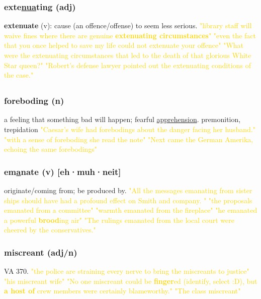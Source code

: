 \documentclass{proc}
\begin{document}
	\subsubsection{\textcolor{brickred}{exte\underline{nua}ting} (adj)}
	\textbf{extenuate} (v): cause (an offence/offense) to seem less serious.
	\textcolor{gold}{"library staff will waive fines where there are genuine \textbf{extenuating circumstances}" "even the fact that you once helped to save my life could not extenuate your offence" "What were the extenuating circumstances that led to the death of that glorious White Star queen?" "Robert's defense lawyer pointed out the extenuating conditions of the case."}
	
	\newpage
	\subsection{}
	\subsubsection{\textcolor{brickred}{foreboding} (n)}
	a feeling that something bad will happen; fearful \underline{apprehension}. premonition, trepidation
	\textcolor{gold}{"Caesar's wife had forebodings about the danger facing her husband." "with a sense of foreboding she read the note" "Next came the German Amerika, echoing the same forebodings"}
	
	\subsubsection{\textcolor{brickred}{em\underline{a}nate} (v) [eh·muh·neit]}
	originate/coming from; be produced by.
	\textcolor{gold}{"All the messages emanating from sister ships should have had a profound effect on Smith and company. " "the proposals emanated from a committee" "warmth emanated from the fireplace" "he emanated a powerful \textbf{brood}ing air" "The rulings emanated from the local court were cheered by the conservatives."}
	
	\subsubsection{\textcolor{brickred}{miscreant} (adj/n)}
	VA 370.
	\textcolor{gold}{"the police are straining every nerve to bring the miscreants to justice" "his miscreant wife" "No one miscreant could be \textbf{finger}ed (identify, select :D), but \textbf{a host of} crew members were certainly blameworthy." "The class miscreant"}
	
\end{document}
